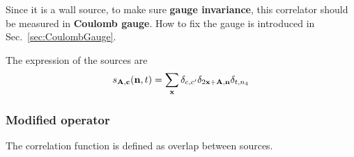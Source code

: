 Since it is a wall source, to make sure \textbf{gauge invariance}, this correlator should be measured in \textcolor[rgb]{0,0,1}{\textbf{Coulomb gauge}}. How to fix the gauge is introduced in Sec.~\ref{sec:CoulombGauge}.

The expression of the sources are
\begin{equation}
\begin{split}
&s_{\bf A,c}({\bf n}, t) = \sum _{{\bf x}} \delta _{c,c'}\delta _{2{\bf x}+{\bf A},{\bf n}}\delta _{t,n_4}\\
\end{split}
\end{equation}

\subsubsection{\label{ModifiedOperator}Modified operator}

The correlation function is defined as overlap between sources.

